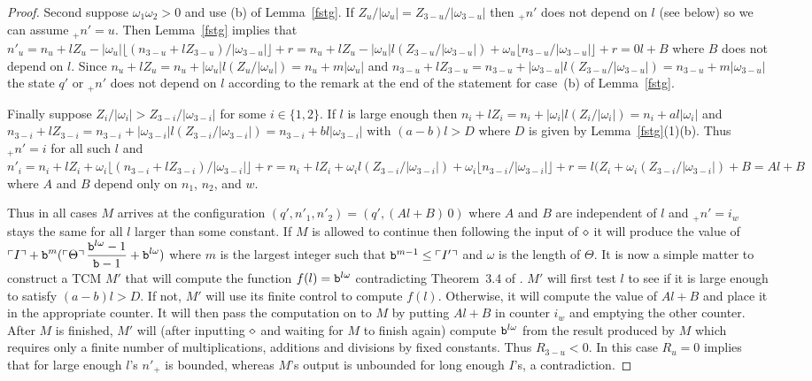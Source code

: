 \documentclass[12pt]{article}
\begin{document}
\begin{proof}
Second suppose $\omega_1\omega_2>0$ and use (b) of
Lemma~\ref{fstg}. If $Z_u/|\omega_u|=Z_{3-u}/|\omega_{3-u}|$ then
${}_+n'$ does not depend on $l$ (see below) so we can assume
${}_+n'=u$. Then Lemma~\ref{fstg} implies that
$n'_u=n_u+lZ_u-|\omega_u|\lfloor(n_{3-u}+lZ_{3-u})/|\omega_{3-u}|\rfloor+r
=n_u+lZ_u-|\omega_u|l(Z_{3-u}/|\omega_{3-u}|)+\omega_u\lfloor
n_{3-u}/|\omega_{3-u}|\rfloor+r=0l+B$ where $B$ does not depend on
$l$. Since $n_u+lZ_u=n_u+|\omega_u|l(Z_u/|\omega_u|)=n_u+m|\omega_u|$
and
$n_{3-u}+lZ_{3-u}=n_{3-u}+|\omega_{3-u}|l(Z_{3-u}/|\omega_{3-u}|)=n_{3-u}+m|\omega_{3-u}|$
the state $q'$ or ${}_+n'$ does not depend on $l$ according to the
remark at the end of the statement for case~(b) of Lemma~\ref{fstg}.
 
Finally suppose $Z_i/|\omega_i|>Z_{3-i}/|\omega_{3-i}|$ for some
$i\in\{1,2\}$. If $l$ is large enough then
$n_i+lZ_i=n_i+|\omega_i|l(Z_i/|\omega_i|)=n_i+al|\omega_i|$ and
$n_{3-i}+lZ_{3-i}=n_{3-i}+|\omega_{3-i}|l(Z_{3-i}/|\omega_{3-i}|)=n_{3-i}+bl|\omega_{3-i}|$
with $(a-b)l>D$ where $D$ is given by Lemma~\ref{fstg}(1)(b).  Thus
${}_+n'=i$ for all such $l$ and
$n'_i=n_i+lZ_i+\omega_i\lfloor(n_{3-i}+lZ_{3-i})/|\omega_{3-i}|\rfloor+r
=n_i+lZ_i+\omega_il(Z_{3-i}/|\omega_{3-i}|)+\omega_i\lfloor
n_{3-i}/|\omega_{3-i}|\rfloor+r=
l(Z_i+\omega_i(Z_{3-i}/|\omega_{3-i}|)+B=Al+B$ where $A$ and $B$
depend only on $n_1$, $n_2$, and $w$.

Thus in all cases $M$ arrives at the configuration
$(q',n'_1,n'_2)=(q', (Al+B)\, 0)$ where $A$ and $B$ are independent of
$l$ and ${}_+n'=i_w$ stays the same for all $l$ larger than some
constant. If $M$ is allowed to continue then following the input of
$\diamond$ it will produce the value of $\displaystyle \ulcorner
I\urcorner+{\tt b}^m(\ulcorner\Theta\urcorner\,{{\tt b}^{l\omega}-1\over{\tt b}-1}
+{\tt b}^{l\omega})$ where $m$ is the largest integer such that
${\tt b}^{m-1}\leq \ulcorner I'\urcorner$ and $\omega$ is the length of
$\Theta$. It is now a simple matter to construct a TCM $M'$ that will
compute the function $f(l)={\tt b}^{l\omega}$ contradicting Theorem~3.4
of \cite{ibarra}. $M'$ will first test $l$ to see if it is large
enough to satisfy $(a-b)l>D$. If not, $M'$ will use its finite control
to compute $f(l)$. Otherwise, it will compute the value of $Al+B$ and
place it in the appropriate counter. It will then pass the computation
on to $M$ by putting $Al+B$ in counter $i_w$ and emptying the other
counter. After $M$ is finished, $M'$ will (after inputting $\diamond$
and waiting for $M$ to finish again) compute ${\tt b}^{l\omega}$ from the
result produced by $M$ which requires only a finite number of
multiplications, additions and divisions by fixed constants. Thus
$R_{3-u}<0$. In this case $R_u=0$ implies that for large enough $l$'s
$n'_+$ is bounded, whereas $M$'s output is unbounded for long enough
$I$'s, a contradiction.
\end{proof}
\end{document}

